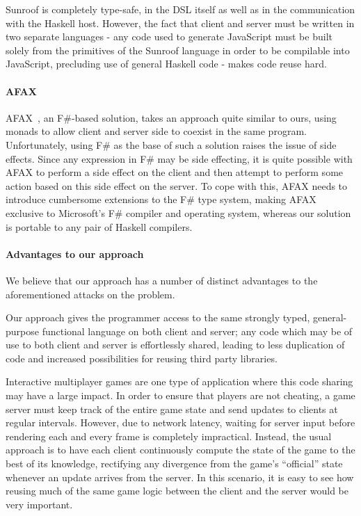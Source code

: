 \documentclass[preprint]{sigplanconf}
\begin{document}
Sunroof is completely type-safe, in the DSL itself as well as in the
communication with the Haskell host. However, the fact that client and server
must be written in two separate languages - any code used to generate
JavaScript must be built solely from the primitives of the Sunroof
language in order to be compilable into JavaScript, precluding use of general
Haskell code - makes code reuse hard.

\paragraph{AFAX} AFAX\ \cite{afax}, an F\#-based solution, takes an approach
quite similar to ours, using monads to allow client and server side to coexist
in the same program. Unfortunately, using F\# as the base of such a solution
raises the issue of side effects. Since any expression in F\# may be side
effecting, it is quite possible with AFAX to perform a side effect on the client
and then attempt to perform some action based on this side effect on the server.
To cope with this, AFAX needs to introduce cumbersome extensions to the F\#
type system, making AFAX exclusive to Microsoft's F\# compiler and operating
system, whereas our solution is portable to any pair of Haskell compilers.

\paragraph{Advantages to our approach} We believe that our approach has a
number of distinct advantages to the aforementioned attacks on the problem.

Our approach gives the programmer access to the same strongly typed,
general-purpose functional language on both client and server; any code which
may be of use to both client and server is effortlessly shared, leading to less
duplication of code and increased possibilities for reusing third party
libraries.

Interactive multiplayer games are one type of application where this code
sharing may have a large impact. In order to ensure that players are not
cheating, a game server must keep track of the entire game state and send
updates to clients at regular intervals. However, due to network latency,
waiting for server input before rendering each and every frame is completely
impractical. Instead, the usual approach is to have each client continuously
compute the state of the game to the best of its knowledge, rectifying any
divergence from the game's ``official'' state whenever an update arrives from
the server. In this scenario, it is easy to see how reusing much of the same
game logic between the client and the server would be very important.
\end{document}
